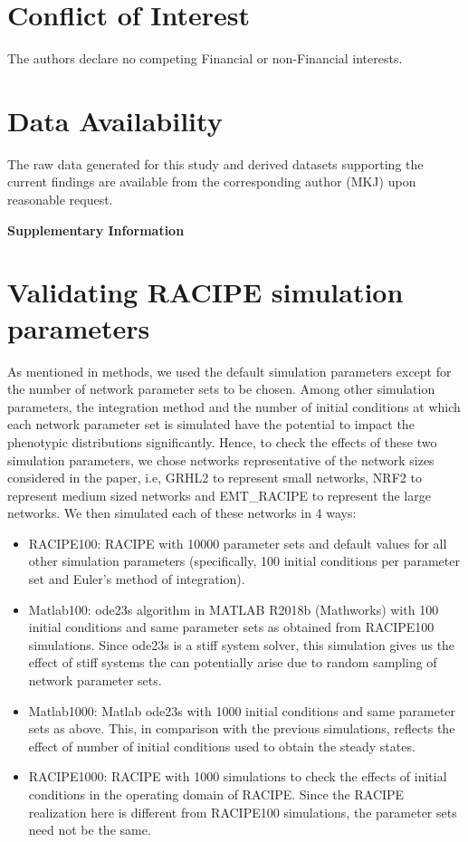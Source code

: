 \documentclass[preprint,review,12pt]{elsarticle}
\newcommand{\beginsupplement}{%
	\setcounter{table}{0}
	\renewcommand{\thetable}{S\arabic{table}}%
	\setcounter{figure}{0}
	\renewcommand{\thefigure}{S\arabic{figure}}%
	\setcounter{section}{0}
}
\begin{document}
	\section{Conflict of Interest}
	The authors declare no competing Financial or non-Financial interests.
	
	\section{Data Availability}
	The raw data generated for this study and derived datasets supporting the current findings are available from the corresponding author (MKJ) upon reasonable request.
	
	\newpage
    
    
    \printbibliography
	\newpage
	\beginsupplement
	\Large{\textbf{Supplementary Information}
	\newline
	\section{\color{red}\textbf{Validating RACIPE simulation parameters}}
	
	\color{red}\small{As mentioned in methods, we used the default simulation parameters except for the number of network parameter sets to be chosen. Among other simulation parameters, the integration method and the number of initial conditions at which each network parameter set is simulated have the potential to impact the phenotypic distributions significantly. Hence, to check the effects of these two simulation parameters, we chose networks representative of the network sizes considered in the paper, i.e, GRHL2 to represent small networks, NRF2 to represent medium sized networks and EMT\_RACIPE to represent the large networks. We then simulated each of these networks in 4 ways:
	\begin{itemize}
	    \item RACIPE100: RACIPE with 10000 parameter sets and default values for all other simulation parameters (specifically, 100 initial conditions per parameter set and Euler's method of integration).
	    \item Matlab100: ode23s algorithm \cite{Shampine1997} in MATLAB R2018b (Mathworks) with 100 initial conditions and same parameter sets as obtained from RACIPE100 simulations. Since ode23s is a stiff system solver, this simulation gives us the effect of stiff systems the can potentially arise due to random sampling of network parameter sets.
	    \item Matlab1000: Matlab ode23s with 1000 initial conditions and same parameter sets as above. This, in comparison with the previous simulations, reflects the effect of number of initial conditions used to obtain the steady states. 
	    \item RACIPE1000: RACIPE with 1000 simulations to check the effects of initial conditions in the operating domain of RACIPE. Since the RACIPE realization here is different from RACIPE100 simulations, the parameter sets need not be the same.
	\end{itemize}
	
}}
\end{document}
